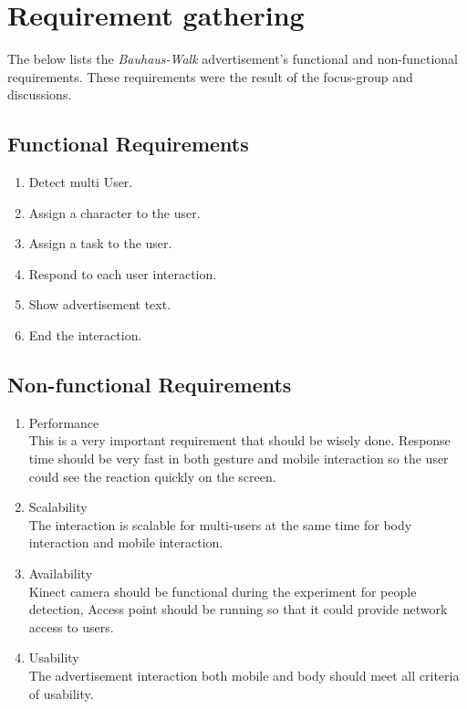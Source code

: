 \section{Requirement gathering}
The below lists the \emph{Bauhaus-Walk} advertisement's functional and non-functional requirements. These requirements were the result of the focus-group and discussions.

\subsection{Functional Requirements}

\begin{enumerate}
\item	Detect multi User.
\item	Assign a character to the user. 
\item	Assign a task to the user.
\item	Respond to each user interaction.
\item	Show advertisement text.
\item	End the interaction.
\end{enumerate}


\subsection{Non-functional Requirements}

\begin{enumerate}
\item	Performance \\
This is a very important requirement that should be wisely done. Response time should be very fast in both gesture and mobile interaction so the user could see the reaction quickly on the screen. 

\item	Scalability \\
The interaction is scalable for multi-users at the same time for body interaction and mobile interaction.

\item	Availability \\
Kinect camera should be functional during the experiment for people detection, Access point should be running so that it could provide network access to users.

\item	Usability \\
The advertisement interaction both mobile and body should meet all criteria of usability.
\end{enumerate}

